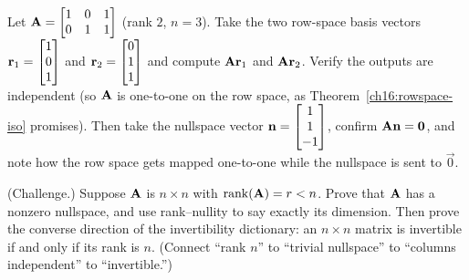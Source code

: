 \begin{exercise}\label{ch16:ex-rowspace-iso}
Let $\mathbf{A}=\begin{bmatrix} 1 & 0 & 1 \\ 0 & 1 & 1 \end{bmatrix}$ (rank $2$,
$n=3$). Take the two row-space basis vectors $\mathbf{r}_1=\begin{bmatrix}1\\0\\1\end{bmatrix}$ and
$\mathbf{r}_2=\begin{bmatrix}0\\1\\1\end{bmatrix}$ and compute $\mathbf{A}\mathbf{r}_1$ and $\mathbf{A}\mathbf{r}_2$.
Verify the outputs are independent (so $\mathbf{A}$ is one-to-one on the row space,
as Theorem~\ref{ch16:rowspace-iso} promises). Then take the nullspace vector
$\mathbf{n}=\begin{bmatrix}1\\1\\-1\end{bmatrix}$, confirm $\mathbf{A}\mathbf{n}=\mathbf{0}$, and note how the row
space gets mapped one-to-one while the nullspace is sent to $\vec0$.
\end{exercise}

\begin{exercise}\label{ch16:ex-challenge}
(Challenge.) Suppose $\mathbf{A}$ is $n\times n$ with $\operatorname{rank}(\mathbf{A})=r<n$. Prove that
$\mathbf{A}$ has a nonzero nullspace, and use rank--nullity to say exactly its
dimension. Then prove the converse direction of the invertibility dictionary: an
$n\times n$ matrix is invertible if and only if its rank is $n$. (Connect ``rank
$n$'' to ``trivial nullspace'' to ``columns independent'' to ``invertible.'')
\end{exercise}
